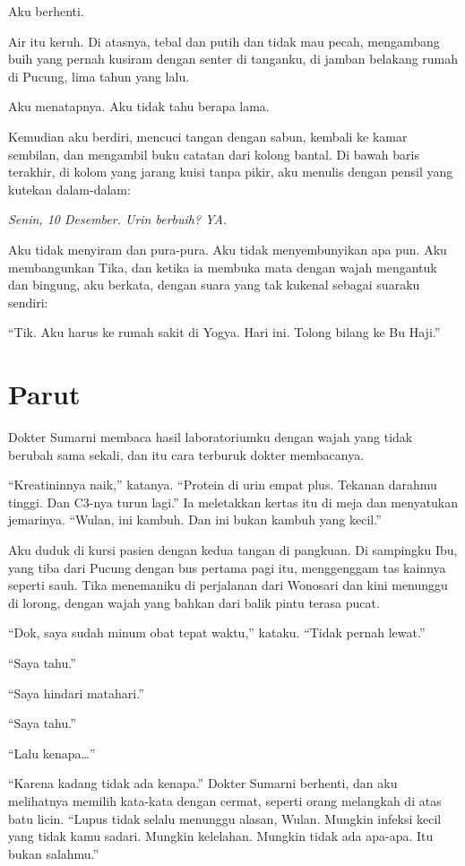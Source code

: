 \documentclass[11pt,twoside,openany]{book}
\begin{document}
Aku berhenti.

Air itu keruh. Di atasnya, tebal dan putih dan tidak mau pecah, mengambang buih yang pernah kusiram dengan senter di tanganku, di jamban belakang rumah di Pucung, lima tahun yang lalu.

Aku menatapnya. Aku tidak tahu berapa lama.

Kemudian aku berdiri, mencuci tangan dengan sabun, kembali ke kamar sembilan, dan mengambil buku catatan dari kolong bantal. Di bawah baris terakhir, di kolom yang jarang kuisi tanpa pikir, aku menulis dengan pensil yang kutekan dalam-dalam:

\emph{Senin, 10 Desember. Urin berbuih? YA.}

Aku tidak menyiram dan pura-pura. Aku tidak menyembunyikan apa pun. Aku membangunkan Tika, dan ketika ia membuka mata dengan wajah mengantuk dan bingung, aku berkata, dengan suara yang tak kukenal sebagai suaraku sendiri:

``Tik. Aku harus ke rumah sakit di Yogya. Hari ini. Tolong bilang ke Bu Haji.''

\chapter{Parut}
Dokter Sumarni membaca hasil laboratoriumku dengan wajah yang tidak berubah sama sekali, dan itu cara terburuk dokter membacanya.

``Kreatininnya naik,'' katanya. ``Protein di urin empat plus. Tekanan darahmu tinggi. Dan C3-nya turun lagi.'' Ia meletakkan kertas itu di meja dan menyatukan jemarinya. ``Wulan, ini kambuh. Dan ini bukan kambuh yang kecil.''

Aku duduk di kursi pasien dengan kedua tangan di pangkuan. Di sampingku Ibu, yang tiba dari Pucung dengan bus pertama pagi itu, menggenggam tas kainnya seperti sauh. Tika menemaniku di perjalanan dari Wonosari dan kini menunggu di lorong, dengan wajah yang bahkan dari balik pintu terasa pucat.

``Dok, saya sudah minum obat tepat waktu,'' kataku. ``Tidak pernah lewat.''

``Saya tahu.''

``Saya hindari matahari.''

``Saya tahu.''

``Lalu kenapa\ldots{}''

``Karena kadang tidak ada kenapa.'' Dokter Sumarni berhenti, dan aku melihatnya memilih kata-kata dengan cermat, seperti orang melangkah di atas batu licin. ``Lupus tidak selalu menunggu alasan, Wulan. Mungkin infeksi kecil yang tidak kamu sadari. Mungkin kelelahan. Mungkin tidak ada apa-apa. Itu bukan salahmu.''
\end{document}
